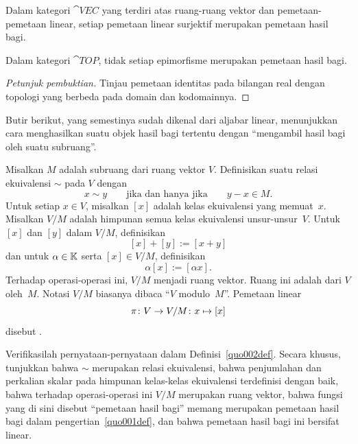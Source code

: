 \begin{exam} Dalam kategori $\cat{VEC}$ yang terdiri atas ruang-ruang vektor dan pemetaan-pemetaan linear, setiap pemetaan linear
surjektif merupakan pemetaan hasil bagi.
\end{exam}

\begin{exam}\label{C021734} Dalam kategori $\cat{TOP}$, tidak setiap epimorfisme merupakan
pemetaan hasil bagi.
\end{exam}

\begin{proof}[\emph{Petunjuk pembuktian}] Tinjau pemetaan identitas pada bilangan real dengan topologi yang berbeda
pada domain dan kodomainnya. \ns
\end{proof}

Butir berikut, yang semestinya sudah dikenal dari aljabar linear, menunjukkan cara menghasilkan suatu objek hasil bagi tertentu dengan
``mengambil hasil bagi oleh suatu subruang''.

\begin{defn}\label{quo002def} Misalkan $M$ adalah subruang dari ruang vektor $V$. Definisikan suatu
relasi ekuivalensi $\sim$ pada $V$ dengan
   \[ x \sim y \qquad \text{jika dan hanya jika} \qquad y - x \in M. \]
Untuk setiap $x \in V$, misalkan $[x]$ adalah kelas ekuivalensi yang memuat~$x$.
Misalkan $V/M$ adalah himpunan semua kelas ekuivalensi unsur-unsur~$V$. Untuk $[x]$ dan $[y]$
dalam $V/M$, definisikan
  \[ [x] + [y] := [x+y]\]
dan untuk $\alpha \in \mathbb{K}$ serta $[x] \in V/M$, definisikan
  \[\alpha[x] := [\alpha x].\]
Terhadap operasi-operasi ini, $V/M$ menjadi ruang vektor. Ruang ini adalah
 dari $V$ oleh~$M$. Notasi $V/M$ biasanya dibaca ``$V$ modulo~$M$''.
Pemetaan linear
  \[ \pi\colon V \rightarrow V/M\colon x \mapsto [x] \]
disebut
.
\end{defn}

\begin{exer} Verifikasilah pernyataan-pernyataan dalam Definisi~\ref{quo002def}. Secara khusus,
tunjukkan bahwa $\sim$ merupakan relasi ekuivalensi, bahwa penjumlahan dan perkalian skalar pada
himpunan kelas-kelas ekuivalensi terdefinisi dengan baik, bahwa terhadap operasi-operasi ini $V/M$ merupakan
ruang vektor, bahwa fungsi yang di sini disebut ``pemetaan hasil bagi'' memang merupakan pemetaan hasil bagi
dalam pengertian~\ref{quo001def}, dan bahwa pemetaan hasil bagi ini bersifat linear.
\end{exer}

